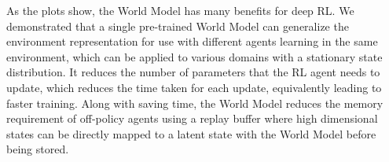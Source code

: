 As the plots show, the World Model has many benefits for deep RL. We demonstrated that a single pre-trained World Model can generalize the environment representation for use with different agents learning in the same environment, which can be applied to various domains with a stationary state distribution. It reduces the number of parameters that the RL agent needs to update, which reduces the time taken for each update, equivalently leading to faster training. Along with saving time, the World Model reduces the memory requirement of off-policy agents using a replay buffer where high dimensional states can be directly mapped to a latent state with the World Model before being stored.
